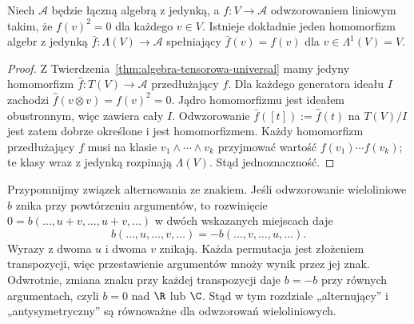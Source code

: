 \begin{twierdzenie}
\label{thm:wedge-algebra-universal}
Niech $\mathcal A$ będzie łączną algebrą z jedynką,
a $f\colon V\to\mathcal A$ odwzorowaniem liniowym takim, że
$f(v)^2=0$ dla każdego $v\in V$. Istnieje dokładnie jeden
homomorfizm algebr z jedynką
$\bar f\colon\Lambda(V)\to\mathcal A$ spełniający
$\bar f(v)=f(v)$ dla $v\in\Lambda^1(V)=V$.
\end{twierdzenie}
\begin{proof}
Z Twierdzenia~\ref{thm:algebra-tensorowa-universal} mamy
jedyny homomorfizm $\widehat f\colon T(V)\to\mathcal A$
przedłużający $f$. Dla każdego generatora ideału $I$
zachodzi $\widehat f(v\otimes v)=f(v)^2=0$.
Jądro homomorfizmu jest ideałem obustronnym, więc zawiera
cały $I$. Odwzorowanie
$\bar f([t]):=\widehat f(t)$ na $T(V)/I$ jest zatem
dobrze określone i jest homomorfizmem. Każdy homomorfizm
przedłużający $f$ musi na klasie
$v_1\wedge\cdots\wedge v_k$ przyjmować wartość
$f(v_1)\cdots f(v_k)$; te klasy wraz z jedynką rozpinają
$\Lambda(V)$. Stąd jednoznaczność.
\end{proof}

Przypomnijmy związek alternowania ze znakiem. Jeśli odwzorowanie
wieloliniowe $b$ znika przy powtórzeniu argumentów, to rozwinięcie
$0=b(\ldots,u+v,\ldots,u+v,\ldots)$ w dwóch wskazanych miejscach
daje
\[
 b(\ldots,u,\ldots,v,\ldots)
 =-b(\ldots,v,\ldots,u,\ldots).
\]
Wyrazy z dwoma $u$ i dwoma $v$ znikają. Każda permutacja jest
złożeniem transpozycji, więc przestawienie argumentów mnoży wynik
przez jej znak. Odwrotnie, zmiana znaku przy każdej transpozycji
daje $b=-b$ przy równych argumentach, czyli $b=0$ nad $\R$ lub $\C$.
Stąd w tym rozdziale „alternujący” i „antysymetryczny” są równoważne
dla odwzorowań wieloliniowych.

